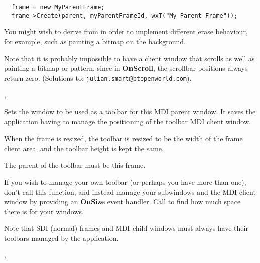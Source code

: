\begin{verbatim}
  frame = new MyParentFrame;
  frame->Create(parent, myParentFrameId, wxT("My Parent Frame"));
\end{verbatim}


You might wish to derive from  in order
to implement different erase behaviour, for example, such as painting a bitmap
on the background.

Note that it is probably impossible to have a client window that scrolls as well as painting
a bitmap or pattern, since in {\bf OnScroll}, the scrollbar positions always return zero.
(Solutions to: \verb$julian.smart@btopenworld.com$).


,\rtfsp
{}

\label{wxmdiparentframesettoolbar}


Sets the window to be used as a toolbar for this
MDI parent window. It saves the application having to manage the positioning
of the toolbar MDI client window.




When the frame is resized, the toolbar is resized to be the width of
the frame client area, and the toolbar height is kept the same.

The parent of the toolbar must be this frame.

If you wish to manage your own toolbar (or perhaps you have more than one),
don't call this function, and instead manage your subwindows and the MDI client window by
providing an {\bf OnSize} event handler. Call  to
find how much space there is for your windows.

Note that SDI (normal) frames and MDI child windows must always have their
toolbars managed by the application.


,\rtfsp
{}

